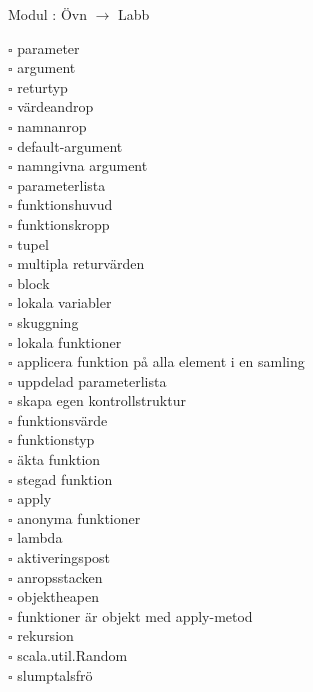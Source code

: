 
    Modul : Övn  $\rightarrow$ Labb 
    \begin{multicols}{3}\SlideFontTiny
    $\square$ parameter \\
$\square$ argument \\
$\square$ returtyp \\
$\square$ värdeandrop \\
$\square$ namnanrop \\
$\square$ default-argument \\
$\square$ namngivna argument \\
$\square$ parameterlista \\
$\square$ funktionshuvud \\
$\square$ funktionskropp \\
$\square$ tupel \\
$\square$ multipla returvärden \\
$\square$ block \\
$\square$ lokala variabler \\
$\square$ skuggning \\
$\square$ lokala funktioner \\
$\square$ applicera funktion på alla element i en samling \\
$\square$ uppdelad parameterlista \\
$\square$ skapa egen kontrollstruktur \\
$\square$ funktionsvärde \\
$\square$ funktionstyp \\
$\square$ äkta funktion \\
$\square$ stegad funktion \\
$\square$ apply \\
$\square$ anonyma funktioner \\
$\square$ lambda \\
$\square$ aktiveringspost \\
$\square$ anropsstacken \\
$\square$ objektheapen \\
$\square$ funktioner är objekt med apply-metod \\
$\square$ rekursion \\
$\square$ scala.util.Random \\
$\square$ slumptalsfrö \\
    \end{multicols}
    